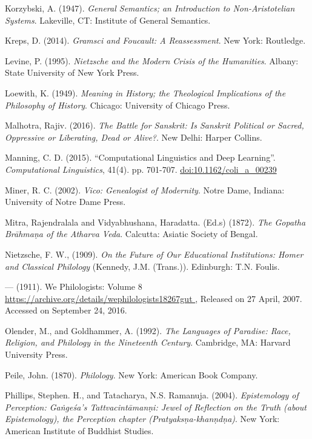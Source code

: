 \begin{thebibliography}{99}
  Korzybski, A. (1947). \textit{General Semantics; an Introduction to Non-Aristotelian Systems}. Lakeville, CT: Institute of General Semantics.

  Kreps, D. (2014). \textit{Gramsci and Foucault: A Reassessment}. New York: Routledge.

  Levine, P. (1995). \textit{Nietzsche and the Modern Crisis of the Humanities}. Albany: State University of New York Press.

  Loewith, K. (1949). \textit{Meaning in History; the Theological Implications of the Philosophy of History}. Chicago: University of Chicago Press.

  Malhotra, Rajiv. (2016). \textit{The Battle for Sanskrit: Is Sanskrit Political or Sacred, Oppressive or Liberating, Dead or Alive?}. New Delhi: Harper Collins.

  Manning, C. D. (2015). “Computational Linguistics and Deep Learning”. \textit{Computational Linguistics}, 41(4). pp. 701-707. \url{doi:10.1162/coli_a_00239}

  Miner, R. C. (2002). \textit{Vico: Genealogist of Modernity}. Notre Dame, Indiana: University of Notre Dame Press.

  Mitra, Rajendralala and Vidyabhushana, Haradatta. (Ed.s) (1872). \textit{The Gopatha Brāhmaṇa of the Atharva Veda}. Calcutta: Asiatic Society of Bengal.

  Nietzsche, F. W., (1909). \textit{On the Future of Our Educational Institutions: Homer and Classical Philology} (Kennedy, J.M. (Trans.)). Edinburgh: T.N. Foulis.

  — (1911). We Philologists: Volume 8 \url{ https://archive.org/details/wephilologists18267gut }, Released on 27 April, 2007. Accessed on September 24, 2016.

  Olender, M., and Goldhammer, A. (1992). \textit{The Languages of Paradise: Race, Religion, and Philology in the Nineteenth Century}. Cambridge, MA: Harvard University Press.

  Peile, John. (1870). \textit{Philology}. New York: American Book Company.

  Phillips, Stephen. H., and Tatacharya, N.S. Ramanuja. (2004). \textit{Epistemology of Perception: Gaṅgeśa's Tattvacintāmanṇi: Jewel of Reflection on the Truth (about Epistemology), the Perception chapter (Pratyaksṇa-khanṇdṇa)}. New York: American Institute of Buddhist Studies.


\end{thebibliography}
